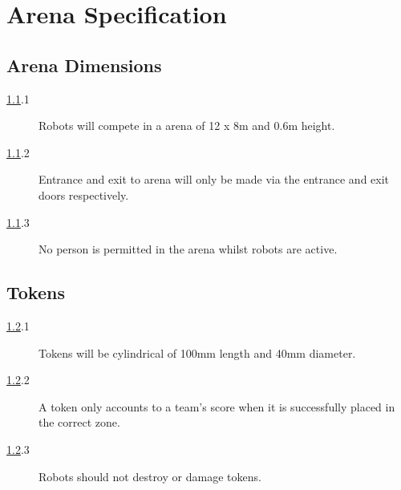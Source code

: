 \section {Arena Specification}

\subsection {Arena Dimensions}
\label{arena}

\begin {description}
\item [\ref{arena}.1] Robots will compete in a arena of 12 x 8m and 0.6m height.
\item [\ref{arena}.2] Entrance and exit to arena will only be made via the entrance and exit doors respectively.
\item [\ref{arena}.3] No person is permitted in the arena whilst robots are active.
\end {description}

\subsection {Tokens}
\label{tokens}

\begin {description} 
\item [\ref{tokens}.1] Tokens will be cylindrical of 100mm length and 40mm diameter.
\item [\ref{tokens}.2] A token only accounts to a team's score when it is successfully placed in the correct zone.
\item [\ref{tokens}.3] Robots should not destroy or damage tokens.
\end {description}

